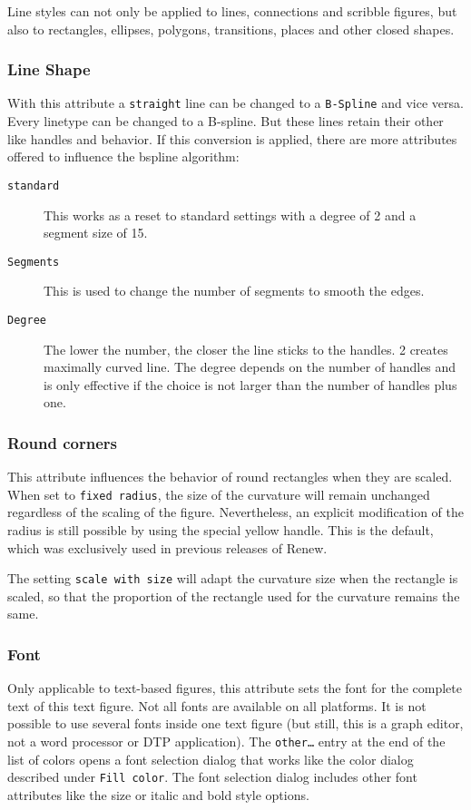 Line styles can not only be applied to lines, connections and scribble
figures, but also to rectangles, ellipses, polygons, transitions, places
and other closed shapes.

\subsubsection{Line Shape}
With this attribute a \texttt{straight}
line can be changed to a \texttt{B-Spline} and vice
versa. Every linetype can be changed to a B-spline. But
these lines retain their other like handles and behavior.
If this conversion is applied, there are more attributes offered to
influence the bspline algorithm:
\begin{description}
\item[\texttt{standard}] This works as a reset
to standard settings with a degree of 2 and a segment size of 15.
\item[\texttt{Segments}] This is used to
change the number of segments to smooth the edges.
\item[\texttt{Degree}] The lower the number, the closer
 the line sticks to the handles. 2 creates maximally curved line.
The degree depends on the number of handles and is only effective
if the choice is not larger than the number of handles plus one.
\end{description}

\subsubsection{Round corners}
This attribute influences the behavior of round rectangles
when they are scaled.
When set to \texttt{fixed radius}, the size of the curvature
will remain unchanged regardless of the scaling of the figure.
Nevertheless, an explicit modification of the radius is still
possible by using the special yellow handle. This is the
default, which was exclusively used in previous releases of Renew.

The setting \texttt{scale with size} will adapt the curvature
size when the rectangle is scaled, so that the proportion of
the rectangle used for the curvature remains the same.

\subsubsection{Font}

Only applicable to text-based figures, this attribute
sets the font for the complete text of this text figure.
Not all fonts are available on all platforms.
It is not possible to use several fonts inside one text figure
(but still, this is a graph editor, not a word processor or
DTP application).
The \texttt{other\dots} entry at the end of the list of colors opens a
font selection dialog that works like the color dialog described 
under \texttt{Fill color}.  
The font selection dialog includes other font attributes like the size or
italic and bold style options.

